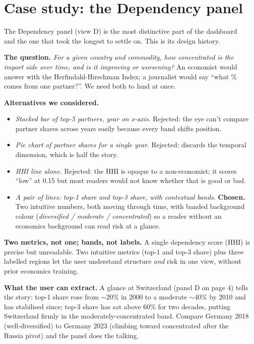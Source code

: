 \documentclass[a4paper,10pt]{article}
\begin{document}
\newpage

\section{Case study: the Dependency panel}

The Dependency panel (view D) is the most distinctive part of the dashboard
and the one that took the longest to settle on. This is its design history.

\textbf{The question.} \emph{For a given country and commodity, how
concentrated is the import side over time, and is it improving or
worsening?} An economist would answer with the Herfindahl-Hirschman Index;
a journalist would say ``what \% comes from one partner?''. We need both
to land at once.

\textbf{Alternatives we considered.}
\begin{itemize}
  \item \emph{Stacked bar of top-5 partners, year on x-axis.}
  Rejected: the eye can't compare partner shares across years easily
  because every band shifts position.
  \item \emph{Pie chart of partner shares for a single year.}
  Rejected: discards the temporal dimension, which is half the story.
  \item \emph{HHI line alone.}
  Rejected: the HHI is opaque to a non-economist; it scores ``low'' at
  0.15 but most readers would not know whether that is good or bad.
  \item \emph{A pair of lines: top-1 share and top-3 share, with
  contextual bands.} \textbf{Chosen.} Two intuitive numbers, both moving
  through time, with banded background colour
  (\emph{diversified / moderate / concentrated}) so a reader without an
  economics background can read risk at a glance.
\end{itemize}

\begin{decision}
\textbf{Two metrics, not one; bands, not labels.}
A single dependency score (HHI) is precise but unreadable. Two
intuitive metrics (top-1 and top-3 share) plus three labelled regions
let the user understand structure \emph{and} risk in one view, without
prior economics training.
\end{decision}

\textbf{What the user can extract.} A glance at Switzerland (panel D on
page 4) tells the story: top-1 share rose from $\sim$20\% in 2000 to a
moderate $\sim$40\% by 2010 and has stabilised since; top-3 share has
sat above 60\% for two decades, putting Switzerland firmly in the
moderately-concentrated band. Compare Germany 2018 (well-diversified)
to Germany 2023 (climbing toward concentrated after the Russia pivot)
and the panel does the talking.
\end{document}
